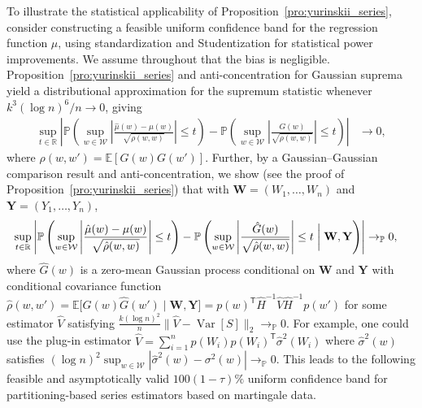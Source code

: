 \documentclass[11pt,lof]{puthesis}
\renewcommand{\P}{\ensuremath{\mathbb{P}}}
\newcommand{\R}{\ensuremath{\mathbb{R}}}
\newcommand{\E}{\ensuremath{\mathbb{E}}}
\newcommand{\bW}{\ensuremath{\mathbf{W}}}
\newcommand{\bY}{\ensuremath{\mathbf{Y}}}
\newcommand{\cW}{\ensuremath{\mathcal{W}}}
\newcommand{\T}{\ensuremath{\mathsf{T}}}
\DeclareMathOperator{\Var}{Var}
\theoremstyle{break}
\theoremstyle{proof}
\begin{document}
To illustrate the statistical applicability of
Proposition~\ref{pro:yurinskii_series}, consider constructing a feasible uniform
confidence band for the regression function $\mu$, using standardization and
Studentization for statistical power improvements. We assume throughout that
the bias is negligible. Proposition~\ref{pro:yurinskii_series} and
anti-concentration for
Gaussian suprema \citep[Corollary~2.1]{chernozhukov2014anti} yield
a distributional approximation for the supremum statistic whenever
$k^3(\log n)^6 / n \to 0$, giving
%
\begin{align*}
  \sup_{t \in \R}
  \left|
    \P\left(
      \sup_{w \in \cW}
      \left|
        \frac{\hat\mu(w)-\mu(w)}{\sqrt{\rho(w,w)}}
      \right| \leq t
    \right)
    -
    \P\left(
      \sup_{w \in \cW}
      \left|
        \frac{G(w)}{\sqrt{\rho(w,w)}}
      \right| \leq t
    \right)
  \right|
  &\to 0,
\end{align*}
%
where $\rho(w,w') = \E[G(w)G(w')]$. Further, by a Gaussian--Gaussian
comparison result \citep[Lemma~3.1]{chernozhukov2013gaussian} and
anti-concentration, we show (see the proof of
Proposition~\ref{pro:yurinskii_series}) that with $\bW = (W_1, \ldots, W_n)$ and
$\bY = (Y_1, \ldots, Y_n)$,
%
\begin{align*}
  \sup_{t \in \R}
  \left|
    \P\left(
      \sup_{w \in \cW}
      \left|
        \frac{\hat\mu(w)-\mu(w)}{\sqrt{\hat\rho(w,w)}}
      \right| \leq t
    \right)
    - \P\left(
      \sup_{w \in \cW}
      \left|
        \frac{\hat G(w)}{\sqrt{\hat\rho(w,w)}}
      \right| \leq t \biggm| \bW, \bY
    \right)
  \right|
  &\to_\P 0,
\end{align*}
%
where $\hat G(w)$ is a zero-mean Gaussian process
conditional on $\bW$ and $\bY$ with conditional covariance function
$\hat\rho(w,w')
=\E\big[\hat G(w) \hat G(w') \mid \bW, \bY \big]
= p(w)^\T \hat H^{-1} \hat V \hat H^{-1}p(w')$
for some estimator $\hat V$ satisfying
$\frac{k (\log n)^2}{n}
\big\|\hat V-\Var[S]\big\|_2 \to_\P 0$.
For example, one could use the plug-in estimator
$\hat V=\sum_{i=1}^n p(W_i) p(W_i)^\T \hat{\sigma}^2(W_i)$
where $\hat{\sigma}^2(w)$ satisfies
$(\log n)^2 \sup_{w \in \cW}
|\hat{\sigma}^2(w)-\sigma^2(w)| \to_\P 0$.
This leads to the following feasible and asymptotically valid
$100(1-\tau)\%$
uniform confidence band for partitioning-based series estimators
based on martingale data.
\end{document}
